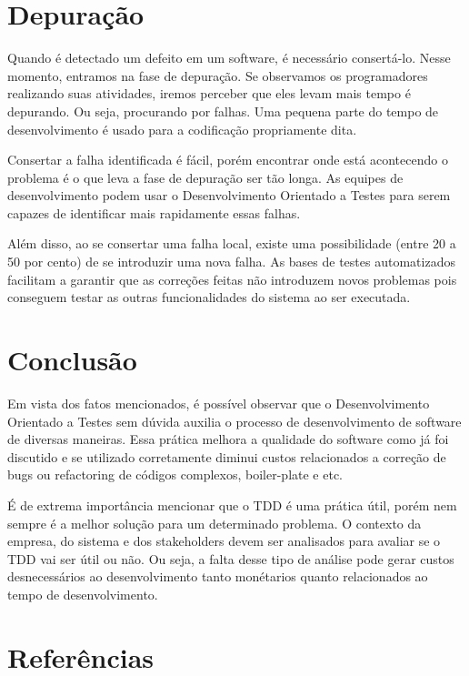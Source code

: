 \documentclass[12pt]{article}
\begin{document}
  \section{Depuração}

  Quando é detectado um defeito em um software, é necessário consertá-lo. Nesse
  momento, entramos na fase de depuração. Se observamos os programadores 
  realizando suas atividades, iremos perceber que eles levam mais tempo é 
  depurando. Ou seja, procurando por falhas.
  Uma pequena parte do tempo de desenvolvimento é usado para a 
  codificação propriamente dita.

  Consertar a falha identificada é fácil, porém encontrar onde está acontecendo
  o problema é o que leva a fase de depuração ser tão longa. As equipes de 
  desenvolvimento podem usar o Desenvolvimento Orientado a Testes
  para serem capazes de identificar mais rapidamente essas falhas.

  Além disso, ao se consertar uma falha local, existe uma possibilidade (entre
  20 a 50 por cento) de se introduzir uma nova falha. As bases de testes 
  automatizados facilitam a garantir que as correções feitas não introduzem 
  novos problemas pois conseguem testar as outras funcionalidades do sistema
  ao ser executada.

  \section{Conclusão}

  Em vista dos fatos mencionados, é possível observar que o Desenvolvimento Orientado a Testes 
  sem dúvida auxilia o processo de desenvolvimento de software de diversas
  maneiras. Essa prática melhora a qualidade do software como já foi discutido
  e se utilizado corretamente diminui custos relacionados a correção de bugs 
  ou refactoring de códigos complexos, boiler-plate e etc.

  É de extrema importância mencionar que o TDD é uma prática útil, porém nem 
  sempre é a melhor solução para um determinado problema. O contexto da empresa, 
  do sistema e dos stakeholders devem ser analisados para avaliar se o TDD vai 
  ser útil ou não. Ou seja, a falta desse tipo de análise pode gerar custos 
  desnecessários ao desenvolvimento tanto monétarios quanto relacionados ao 
  tempo de desenvolvimento.
  \clearpage

  \section{Referências}
\end{document}
